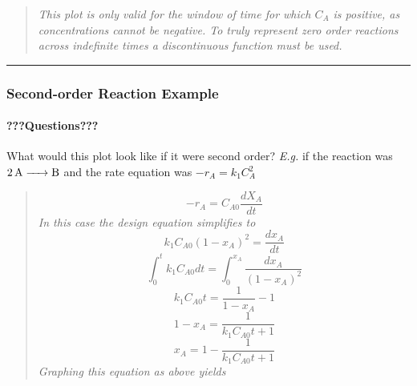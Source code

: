 \documentclass[
]{article}
\begin{document}
\begin{quote}
\emph{This plot is only valid for the window of time for which \(C_A\) is positive, as concentrations cannot be negative. To truly represent zero order reactions across indefinite times a discontinuous function must be used.}
\end{quote}

\begin{center}\rule{0.5\linewidth}{0.5pt}\end{center}

\hypertarget{second-order-reaction-example}{%
\subsubsection{Second-order Reaction Example}\label{second-order-reaction-example}}

\hypertarget{questions-5}{%
\paragraph{???Questions???}\label{questions-5}}

What would this plot look like if it were second order?
\emph{E.g.} if the reaction was \(\ce{ 2A -> B }\) and the rate equation was \(-r_A = k_1C_A^2\)

\begin{quote}
\[-r_A = C_{A0}\frac{dX_A}{dt}\]
\emph{In this case the design equation simplifies to}
\[k_1C_{A0}(1-x_A)^2 = \frac{dx_A}{dt}\]
\[\int_0^tk_1C_{A0}dt = \int_0^{x_A}\frac{dx_A}{(1-x_A)^2}\]
\[k_1C_{A0}t = \frac{1}{1-x_A} - 1\]
\[ 1 - x_A = \frac{1}{k_1C_{A0}t + 1}\]
\[ x_A = 1 - \frac{1}{k_1C_{A0}t + 1}\]
\emph{Graphing this equation as above yields}
\end{quote}
\end{document}
